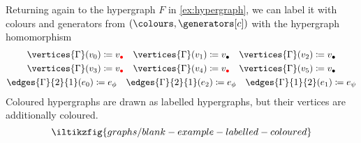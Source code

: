 \begin{example}\label{ex:coloured-hypergraph}
    Returning again to the hypergraph \(F\) in \cref{ex:hypergraph}, we can
    label it with colours and generators from \((\colours,\generators[c])\) with
    the hypergraph homomorphism
    \begin{gather*}
        \vertices{\Gamma}(v_0) \coloneqq v_{\redbullet}
        \quad
        \vertices{\Gamma}(v_1) \coloneqq v_{\bullet}
        \quad
        \vertices{\Gamma}(v_2) \coloneqq v_{\bullet}
        \\
        \vertices{\Gamma}(v_3) \coloneqq v_{\redbullet}
        \quad
        \vertices{\Gamma}(v_4) \coloneqq v_{\redbullet}
        \quad
        \vertices{\Gamma}(v_5) \coloneqq v_{\bullet}
        \\
        \edges{\Gamma}{2}{1}(e_0) \coloneqq e_{\phi}
        \quad
        \edges{\Gamma}{2}{1}(e_2) \coloneqq e_{\phi}
        \quad
        \edges{\Gamma}{1}{2}(e_1) \coloneqq e_{\psi}
    \end{gather*}
    Coloured hypergraphs are drawn as labelled hypergraphs, but their vertices
    are additionally coloured.
    \[
        \iltikzfig{graphs/blank-example-labelled-coloured}
    \]
\end{example}
